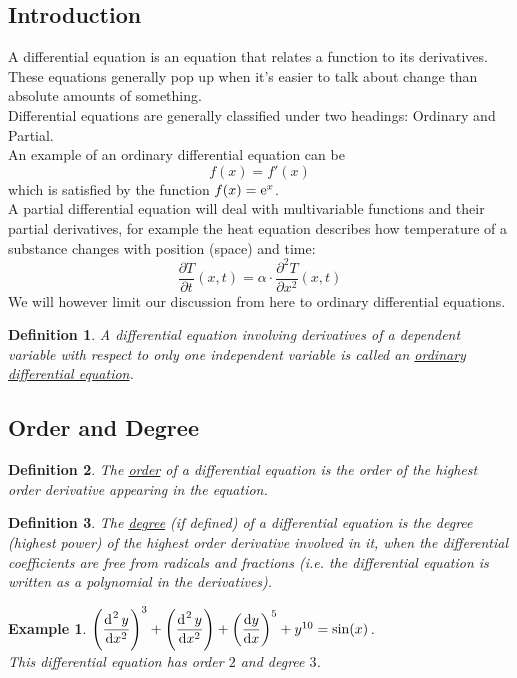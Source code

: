 \documentclass[14]{article}
\newtheorem{define}{Definition}
\newtheorem*{ex}{Example}
\theoremstyle{definition}
\theoremstyle{case}
\begin{document}
\subsection{Introduction}
A differential equation is an equation that relates a function to its derivatives. These equations generally pop up when it's easier to talk about change than absolute amounts of something.\\
Differential equations are generally classified under two headings: Ordinary and Partial.\\
An example of an ordinary differential equation can be
\[f(x) = f'(x)\]
which is satisfied by the function $f(x) = {\rm e}^x$.\\
A partial differential equation will deal with multivariable functions and their partial derivatives, for example the heat equation describes how temperature of a substance changes with position (space) and time:
\[\dfrac{\partial T}{\partial t}(x, t) = \alpha \cdot \dfrac{\partial^2 T}{\partial x^2}(x, t)\]
We will however limit our discussion from here to ordinary differential equations.
\begin{define}
A differential equation involving derivatives of a dependent variable with respect to only one independent variable is called an \underline{ordinary differential equation}.
\end{define}
\subsection{Order and Degree}
\begin{define}
The \underline{order} of a differential equation is the order of the highest order derivative appearing in the equation.
\end{define}
\begin{define}
The \underline{degree} (if defined) of a differential equation is the degree (highest power) of the highest order derivative involved in it, when the differential coefficients are free from radicals and fractions (i.e. the differential equation is written as a polynomial in the derivatives). 
\end{define}
\begin{ex}
$\left( \dfrac{\dif^{\;2} y}{\dif x^2} \right)^3 + \left( \dfrac{\dif^{\;2} y}{\dif x ^2} \right) + \left( \dfrac{\dif y}{\dif x} \right)^5 + y^{10} = \sin(x)$.\\
This differential equation has order $2$ and degree $3$.
\end{ex}
\end{document}
